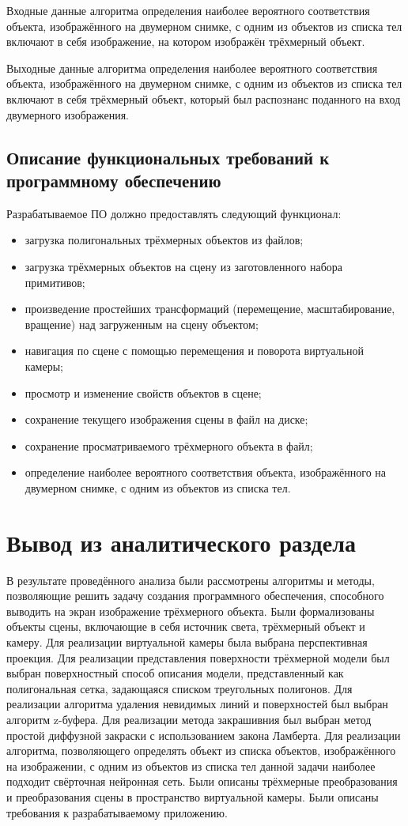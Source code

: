 Входные данные алгоритма определения наиболее вероятного соответствия объекта, изображённого на двумерном снимке, с одним из объектов из списка тел включают в себя изображение, на котором изображён трёхмерный объект.

Выходные данные алгоритма определения наиболее вероятного соответствия объекта, изображённого на двумерном снимке, с одним из объектов из списка тел включают в себя трёхмерный объект, который был распознанс поданного на вход двумерного изображения.

\subsection{Описание функциональных требований к программному обеспечению}
Разрабатываемое ПО должно предоставлять следующий функционал:
\begin{itemize}
\item загрузка полигональных трёхмерных объектов из файлов;
\item загрузка трёхмерных объектов на сцену из заготовленного набора примитивов;
\item произведение простейших трансформаций (перемещение, масштабирование, вращение) над загруженным на сцену объектом;
\item навигация по сцене с помощью перемещения и поворота виртуальной камеры;
\item просмотр и изменение свойств объектов в сцене;
\item сохранение текущего изображения сцены в файл на диске;
\item сохранение просматриваемого трёхмерного объекта в файл;
\item определение наиболее вероятного соответствия объекта, изображённого на двумерном снимке, с одним из объектов из списка тел.
\end{itemize}

\section{Вывод из аналитического раздела}
В результате проведённого анализа были рассмотрены алгоритмы и методы, позволяющие решить задачу создания программного обеспечения, способного выводить на экран изображение трёхмерного объекта.  Были формализованы объекты сцены, включающие в себя источник света, трёхмерный объект и камеру. Для реализации виртуальной камеры была выбрана перспективная проекция. Для реализации представления поверхности трёхмерной модели был выбран поверхностный способ описания модели, представленный как полигональная сетка, задающаяся списком треугольных полигонов. Для реализации алгоритма удаления невидимых линий и поверхностей был выбран алгоритм z-буфера. Для реализации метода закрашивния был выбран метод простой диффузной закраски с использованием закона Ламберта. Для реализации алгоритма, позволяющего определять объект из списка объектов, изображённого на изображении, с одним из объектов из списка тел данной задачи наиболее подходит свёрточная нейронная сеть. Были описаны трёхмерные преобразования и преобразования сцены в пространство виртуальной камеры. Были описаны требования к разрабатываемому приложению.